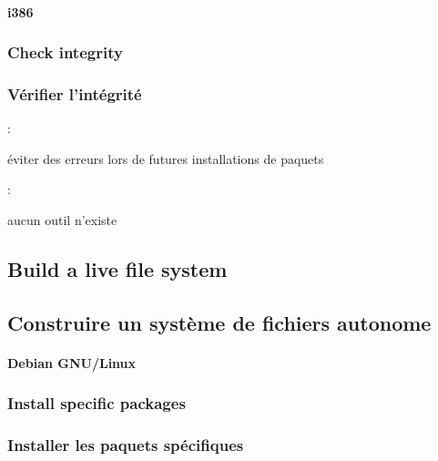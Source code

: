 \paragraph{i386}

\ml
{\subsubsection{Check integrity}}
{\subsubsection{Vérifier l’intégrité}}

:
\begin{itmz}
\item{
{éviter des erreurs lors de futures installations de paquets}}
\end{itmz}

:
\begin{itmz}
\item{
{aucun outil n’existe}}
\end{itmz}

\ml
{\subsection{Build a live file system}}
{\subsection{Construire un système de fichiers autonome}}

\paragraph{Debian GNU/Linux}

\ml
{\subsubsection{Install specific packages}}
{\subsubsection{Installer les paquets spécifiques}}

\paragraph{}

